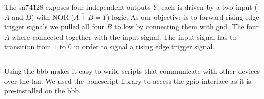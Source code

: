 The \gls{sn74128} exposes four independent outputs $Y$, each is driven by a
two-input ($A$ and $B$) with NOR ($\overline{A+B}=Y$) logic. As our objective
is to forward rising edge trigger signals we pulled all four $B$ to low by
connecting them with \gls{gnd}. The four $A$ where connected together with
the input signal. The input signal has to transition from $1$ to $0$ in order
to signal a rising edge trigger signal.

\begin{listing}[h]
  \inputminted[xleftmargin=.2\linewidth]{javascript}{scripts/trigger.js}
  \captionsetup{width=.6\linewidth}
  \caption{\gls{bbb} script that starts a \gls{http} server to listen for
requests on which to trigger a rising edge signal. On execution it pulls the
signal \gls{gpio} to high. The request callback then pulls the \gls{gpio} to
low for one \SI{1}{\milli\second}.}
\end{listing}

Using the \gls{bbb} makes it easy to write scripts that communicate with
other devices over the \gls{lan}. We used the bonescript library to access
the \gls{gpio} interface as it is pre-installed on the \gls{bbb}.
